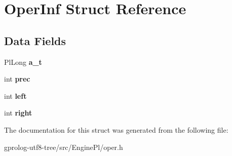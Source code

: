 \hypertarget{structOperInf}{}\section{Oper\+Inf Struct Reference}
\label{structOperInf}
\subsection*{Data Fields}
\begin{DoxyCompactItemize}
\item 
Pl\+Long {\bfseries a\+\_\+t}\hypertarget{structOperInf_a5ab08736fa238d100509038e938fe187}{}\label{structOperInf_a5ab08736fa238d100509038e938fe187}

\item 
int {\bfseries prec}\hypertarget{structOperInf_a50a4ec676df2b3555058f59753d48698}{}\label{structOperInf_a50a4ec676df2b3555058f59753d48698}

\item 
int {\bfseries left}\hypertarget{structOperInf_afbf02377f941f53f5cd63f151c2da1f0}{}\label{structOperInf_afbf02377f941f53f5cd63f151c2da1f0}

\item 
int {\bfseries right}\hypertarget{structOperInf_a558dc457885d6b96f6d8f833f1ce6c66}{}\label{structOperInf_a558dc457885d6b96f6d8f833f1ce6c66}

\end{DoxyCompactItemize}


The documentation for this struct was generated from the following file\+:\begin{DoxyCompactItemize}
\item 
gprolog-\/utf8-\/tree/src/\+Engine\+Pl/oper.\+h\end{DoxyCompactItemize}
